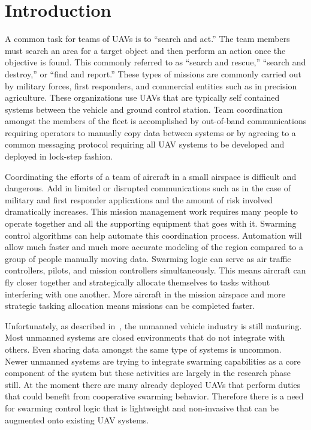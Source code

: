 \chapter{Introduction}
A common task for teams of UAVs is to ``search and act.''  The team members must search an area for a target object and then perform an action once the objective is found.  This commonly referred to as ``search and rescue,'' ``search and destroy,'' or ``find and report.''  These types of missions are commonly carried out by military forces, first responders, and commercial entities such as in precision agriculture.  These organizations use UAVs that are typically self contained systems between the vehicle and ground control station.  Team coordination amongst the members of the fleet is accomplished by out-of-band communications requiring operators to manually copy data between systems or by agreeing to a common messaging protocol requiring all UAV systems to be developed and deployed in lock-step fashion.  

Coordinating the efforts of a team of aircraft in a small airspace is difficult and dangerous.  Add in limited or disrupted communications such as in the case of military and first responder applications and the amount of risk involved dramatically increases.  This mission management work requires many people to operate together and all the supporting equipment that goes with it. Swarming control algorithms can help automate this coordination process.  Automation will allow much faster and much more accurate modeling of the region compared to a group of people manually moving data.  Swarming logic can serve as air traffic controllers, pilots, and mission controllers simultaneously.  This means aircraft can fly closer together and strategically allocate themselves to tasks without interfering with one another.  More aircraft in the mission airspace and more strategic tasking allocation means missions can be completed faster.

Unfortunately, as described in~\citet{dod_uas_roadmap}, the unmanned vehicle industry is still maturing.  Most unmanned systems are closed environments that do not integrate with others.  Even sharing data amongst the same type of systems is uncommon.  Newer unmanned systems are trying to integrate swarming capabilities as a core component of the system but these activities are largely in the research phase still.  At the moment there are many already deployed UAVs that perform duties that could benefit from cooperative swarming behavior.  Therefore there is a need for swarming control logic that is lightweight and non-invasive that can be augmented onto existing UAV systems.

